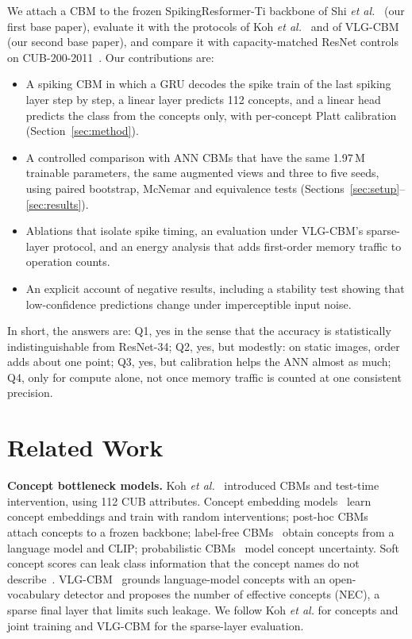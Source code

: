 \documentclass[conference]{IEEEtran}
\begin{document}
We attach a CBM to the frozen SpikingResformer-Ti backbone of Shi \emph{et al.}~\cite{shi2024spikingresformer} (our first base paper), evaluate it with the protocols of Koh \emph{et al.}~\cite{koh2020concept} and of VLG-CBM~\cite{srivastava2024vlgcbm} (our second base paper), and compare it with capacity-matched ResNet controls on CUB-200-2011~\cite{wah2011cub}. Our contributions are:
\begin{itemize}
\item A spiking CBM in which a GRU decodes the spike train of the last spiking layer step by step, a linear layer predicts 112 concepts, and a linear head predicts the class from the concepts only, with per-concept Platt calibration (Section~\ref{sec:method}).
\item A controlled comparison with ANN CBMs that have the same 1.97\,M trainable parameters, the same augmented views and three to five seeds, using paired bootstrap, McNemar and equivalence tests (Sections~\ref{sec:setup}--\ref{sec:results}).
\item Ablations that isolate spike timing, an evaluation under VLG-CBM's sparse-layer protocol, and an energy analysis that adds first-order memory traffic to operation counts.
\item An explicit account of negative results, including a stability test showing that low-confidence predictions change under imperceptible input noise.
\end{itemize}
In short, the answers are: Q1, yes in the sense that the accuracy is statistically indistinguishable from ResNet-34; Q2, yes, but modestly: on static images, order adds about one point; Q3, yes, but calibration helps the ANN almost as much; Q4, only for compute alone, not once memory traffic is counted at one consistent precision.

\section{Related Work}

\textbf{Concept bottleneck models.} Koh \emph{et al.}~\cite{koh2020concept} introduced CBMs and test-time intervention, using 112 CUB attributes. Concept embedding models~\cite{espinosa2022concept} learn concept embeddings and train with random interventions; post-hoc CBMs~\cite{yuksekgonul2023posthoc} attach concepts to a frozen backbone; label-free CBMs~\cite{oikarinen2023labelfree} obtain concepts from a language model and CLIP; probabilistic CBMs~\cite{kim2023probabilistic} model concept uncertainty. Soft concept scores can leak class information that the concept names do not describe~\cite{margeloiu2021concept,mahinpei2021promises,havasi2022addressing}. VLG-CBM~\cite{srivastava2024vlgcbm} grounds language-model concepts with an open-vocabulary detector and proposes the number of effective concepts (NEC), a sparse final layer that limits such leakage. We follow Koh \emph{et al.} for concepts and joint training and VLG-CBM for the sparse-layer evaluation.
\end{document}
